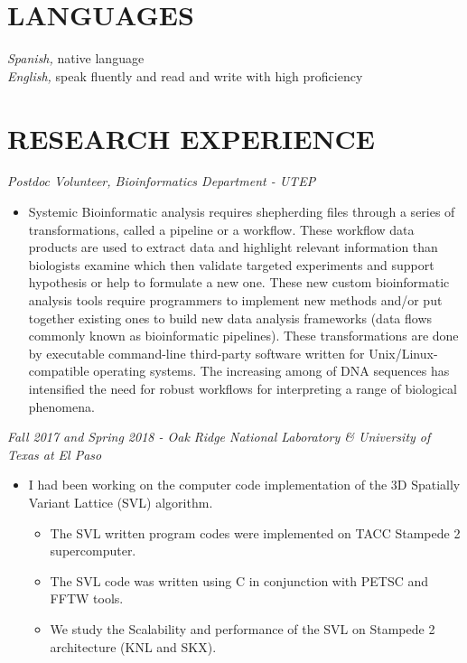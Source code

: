 \documentclass[margin]{res}
\begin{document}
\begin{resume}
\section{LANGUAGES}
{\sl Spanish,} native language\\
{\sl English,} speak fluently and read and write with high proficiency

\section{RESEARCH EXPERIENCE}
{\sl Postdoc Volunteer, Bioinformatics Department - UTEP} %
\begin{itemize}\itemsep -2pt
\item Systemic Bioinformatic analysis requires shepherding files through a series of transformations, called a pipeline or a workflow.
These workflow data products are used to extract data and highlight relevant information than biologists examine which then validate targeted 
experiments and support hypothesis or help to formulate a new one. These new custom bioinformatic analysis tools require programmers to implement
new methods and/or put together existing ones to build new data analysis frameworks (data flows commonly known as bioinformatic pipelines).
These transformations are done by executable command-line third-party software written for Unix/Linux-compatible operating systems. The increasing among of DNA
sequences has intensified the need for robust workflows for interpreting a range of biological phenomena.
\end{itemize}


{\sl Fall 2017 and Spring 2018 - Oak Ridge National Laboratory \& University of Texas at El Paso} \hfill %
\begin{itemize}
\item I had been working on the computer code implementation of the 3D Spatially Variant Lattice (SVL) algorithm.
\begin{itemize}\itemsep -2pt
\item The SVL  written program codes were implemented on TACC Stampede 2 supercomputer.
\item The SVL code was written using C in conjunction with PETSC and FFTW tools.
\item We study the Scalability and performance of the SVL on Stampede 2 architecture (KNL and SKX).
\end{itemize}
\end{itemize}


\end{resume}
\end{document}
